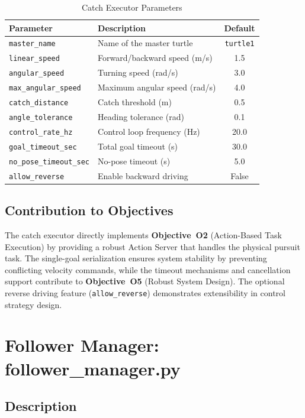 \begin{table}[htbp]
\centering
\caption{Catch Executor Parameters}
\begin{tabular}{llc}
\toprule
\textbf{Parameter} & \textbf{Description} & \textbf{Default} \\
\midrule
\texttt{master\_name} & Name of the master turtle & \texttt{turtle1} \\
\texttt{linear\_speed} & Forward/backward speed (m/s) & 1.5 \\
\texttt{angular\_speed} & Turning speed (rad/s) & 3.0 \\
\texttt{max\_angular\_speed} & Maximum angular speed (rad/s) & 4.0 \\
\texttt{catch\_distance} & Catch threshold (m) & 0.5 \\
\texttt{angle\_tolerance} & Heading tolerance (rad) & 0.1 \\
\texttt{control\_rate\_hz} & Control loop frequency (Hz) & 20.0 \\
\texttt{goal\_timeout\_sec} & Total goal timeout (s) & 30.0 \\
\texttt{no\_pose\_timeout\_sec} & No-pose timeout (s) & 5.0 \\
\texttt{allow\_reverse} & Enable backward driving & False \\
\bottomrule
\end{tabular}
\end{table}

\subsection{Contribution to Objectives}

The catch executor directly implements \textbf{Objective~O2} (Action-Based Task Execution) by providing a robust Action Server that handles the physical pursuit task. The single-goal serialization ensures system stability by preventing conflicting velocity commands, while the timeout mechanisms and cancellation support contribute to \textbf{Objective~O5} (Robust System Design). The optional reverse driving feature (\texttt{allow\_reverse}) demonstrates extensibility in control strategy design.

\section{Follower Manager: follower\_manager.py}

\subsection{Description}

